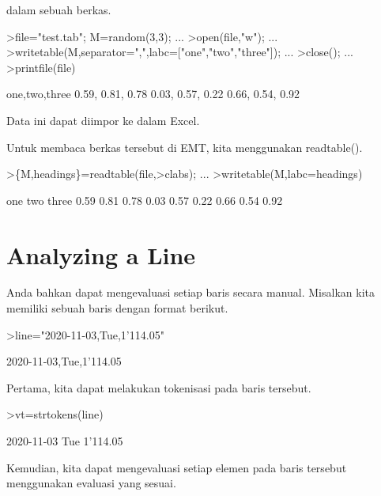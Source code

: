 \documentclass{article}
\newenvironment{eulernotebook}{\par}{\par}
\newcommand{\eulerheading}[1]{\section{#1}}
\newenvironment{eulercomment}{\par\medskip}{\par\medskip}
\begin{document}
\begin{eulernotebook}
\begin{eulercomment}
\begin{eulercomment}
\begin{eulercomment}
\begin{eulercomment}
\begin{eulercomment}
\begin{eulercomment}
\begin{eulercomment}
dalam sebuah berkas.
\end{eulercomment}
\begin{eulerprompt}
>file="test.tab"; M=random(3,3);  ...
>open(file,"w");  ...
>writetable(M,separator=",",labc=["one","two","three"]);  ...
>close(); ...
>printfile(file)
\end{eulerprompt}
\begin{euleroutput}
  one,two,three
        0.59,      0.81,      0.78
        0.03,      0.57,      0.22
        0.66,      0.54,      0.92
\end{euleroutput}
\begin{eulercomment}
Data ini dapat diimpor ke dalam Excel.

Untuk membaca berkas tersebut di EMT, kita menggunakan readtable().
\end{eulercomment}
\begin{eulerprompt}
>\{M,headings\}=readtable(file,>clabs); ...
>writetable(M,labc=headings)
\end{eulerprompt}
\begin{euleroutput}
         one       two     three
        0.59      0.81      0.78
        0.03      0.57      0.22
        0.66      0.54      0.92
\end{euleroutput}
\eulerheading{Analyzing a Line}
\begin{eulercomment}
Anda bahkan dapat mengevaluasi setiap baris secara manual. Misalkan
kita memiliki sebuah baris dengan format berikut.
\end{eulercomment}
\begin{eulerprompt}
>line="2020-11-03,Tue,1'114.05"
\end{eulerprompt}
\begin{euleroutput}
  2020-11-03,Tue,1'114.05
\end{euleroutput}
\begin{eulercomment}
Pertama, kita dapat melakukan tokenisasi pada baris tersebut.
\end{eulercomment}
\begin{eulerprompt}
>vt=strtokens(line)
\end{eulerprompt}
\begin{euleroutput}
  2020-11-03
  Tue
  1'114.05
\end{euleroutput}
\begin{eulercomment}
Kemudian, kita dapat mengevaluasi setiap elemen pada baris tersebut
menggunakan evaluasi yang sesuai.
\end{eulercomment}
\begin{eulerprompt}

\end{eulerprompt}
\end{eulercomment}
\end{eulercomment}
\end{eulercomment}
\end{eulercomment}
\end{eulercomment}
\end{eulercomment}
\end{eulernotebook}
\end{document}
